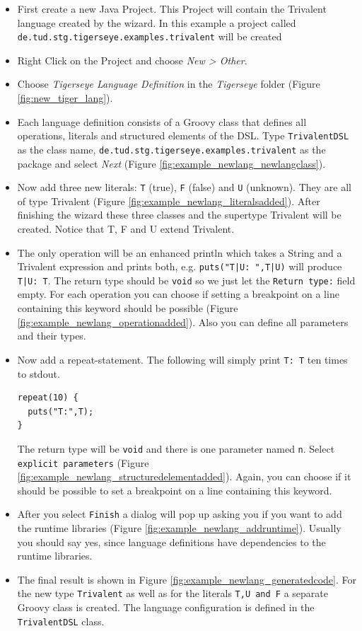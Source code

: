 	\begin{itemize}
	 \item First create a new Java Project. This Project will contain the Trivalent language created by the wizard. In this example a project called \texttt{de.tud.stg.tigerseye.examples.trivalent} will be created
	 \item Right Click on the Project and choose \emph{New > Other}.
	 \item Choose \emph{Tigerseye Language Definition} in the \emph{Tigerseye} folder (Figure \ref{fig:new_tiger_lang}).
	 \item Each language definition consists of a Groovy class that defines all operations, literals and structured elements of the DSL. Type \texttt{TrivalentDSL} as the class name, \texttt{de.tud.stg.tigerseye.examples.trivalent} as the package and select \emph{Next} (Figure \ref{fig:example_newlang_newlangclass}).
	 \item Now add three new literals: \texttt{T} (true), \texttt{F} (false) and \texttt{U} (unknown). They are all of type Trivalent (Figure \ref{fig:example_newlang_literalsadded}). After finishing the wizard these three classes and the supertype Trivalent will be created. Notice that T, F and U extend Trivalent.
	\item The only operation will be an enhanced println which takes a String and a Trivalent expression and prints both, e.g. \texttt{puts("T|U: ",T|U)} will produce \texttt{T|U: T}. The return type should be \texttt{void} so we just let the \texttt{Return type:} field empty. For each operation you can choose if setting a breakpoint on a line containing this keyword should be possible (Figure \ref{fig:example_newlang_operationadded}). Also you can define all parameters and their types.
	\item Now add a repeat-statement. The following will simply print \texttt{T: T} ten times to stdout.
	  \begin{verbatim}	  
repeat(10) {
  puts("T:",T);
}
	  \end{verbatim}
	The return type will be \texttt{void} and there is one parameter named \texttt{n}. Select \texttt{explicit parameters} (Figure \ref{fig:example_newlang_structuredelementadded}).
	Again, you can choose if it should be possible to set a breakpoint on a line containing this keyword.
	\item After you select \texttt{Finish} a dialog will pop up asking you if you want to add the \tiger runtime libraries (Figure \ref{fig:example_newlang_addruntime}). Usually you should say yes, since language definitions have dependencies to the runtime libraries.
	\item The final result is shown in Figure \ref{fig:example_newlang_generatedcode}. For the new type \texttt{Trivalent} as well as for the literals \texttt{T,U and F} a separate Groovy class is created. The language configuration is defined in the \texttt{TrivalentDSL} class.
	\end{itemize}

